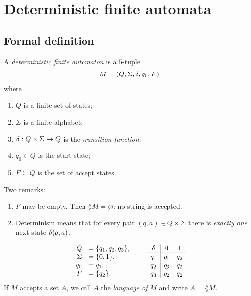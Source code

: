 \section{Deterministic finite automata}

\subsection{Formal definition}
\begin{definition}[DFA]
A \emph{deterministic finite automaton} is a $5$-tuple
\[
  M=(Q,\Sigma,\delta,q_0,F)
\]
where
\begin{enumerate}
  \item $Q$ is a finite set of states;
  \item $\Sigma$ is a finite alphabet;
  \item $\delta:Q\times\Sigma\to Q$ is the \emph{transition function};
  \item $q_0\in Q$ is the start state;
  \item $F\subseteq Q$ is the set of accept states.
\end{enumerate}
\end{definition}

Two remarks:
\begin{enumerate}
  \item $F$ may be empty. Then $\lang{M}=\varnothing$: no string is accepted.
  \item Determinism means that for every pair $(q,a)\in Q\times\Sigma$ there is
        \emph{exactly one} next state $\delta(q,a)$.
\end{enumerate}

\begin{example}
\[
\begin{array}{rl}
  Q&=\{q_1,q_2,q_3\},\\
  \Sigma&=\{0,1\},\\
  q_0&=q_1,\\
  F&=\{q_2\},
\end{array}
\qquad
\begin{array}{c|cc}
\delta & 0 & 1\\
\hline
q_1 & q_1 & q_2\\
q_2 & q_3 & q_2\\
q_3 & q_2 & q_2
\end{array}
\]
If $M$ accepts a set $A$, we call $A$ the \emph{language of} $M$ and write
$A=\lang{M}$.
\end{example}

